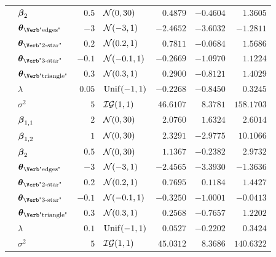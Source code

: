 \begin{table}[t]
\begin{tabular}{cl|rlrrr}
        & $\boldsymbol{\beta}_{2}$                       & $0.5$  & $\mathcal{N}(0,30)$      & $0.4879$  & $-0.4604$ & $1.3605$   \\
        & $\ttheta_{\text{\Verb"edges"}}$    & $-3$   & $\mathcal{N}(-3,1)$      & $-2.4652$ & $-3.6032$ & $-1.2811$  \\
        & $\ttheta_{\text{\Verb"2-star"}}$   & $0.2$  & $\mathcal{N}(0.2,1)$     & $0.7811$  & $-0.0684$ & $1.5686$   \\
        & $\ttheta_{\text{\Verb"3-star"}}$   & $-0.1$ & $\mathcal{N}(-0.1,1)$    & $-0.2669$ & $-1.0970$ & $1.1224$   \\
        & $\ttheta_{\text{\Verb"triangle"}}$ & $0.3$  & $\mathcal{N}(0.3,1)$     & $0.2900$  & $-0.8121$ & $1.4029$   \\
		\midrule
        & $\lambda$                          & $0.05$ & $\mathrm{Unif}(-1,1)$     & $-0.2268$ & $-0.8450$ & $0.3245$   \\
        & $\sigma^2$                         & $5$    & $\mathcal{IG}(1,1)$ & $46.6107$ & $8.3781$  & $158.1703$ \\
        & $\boldsymbol{\beta}_{1,1}$                     & $2$    & $\mathcal{N}(0,30)$      & $2.0760$  & $1.6324$  & $2.6014$   \\
        & $\boldsymbol{\beta}_{1,2}$                     & $1$    & $\mathcal{N}(0,30)$      & $2.3291$  & $-2.9775$ & $10.1066$  \\
        & $\boldsymbol{\beta}_{2}$                       & $0.5$  & $\mathcal{N}(0,30)$      & $1.1367$  & $-0.2382$ & $2.9732$   \\
        & $\ttheta_{\text{\Verb"edges"}}$    & $-3$   & $\mathcal{N}(-3,1)$      & $-2.4565$ & $-3.3930$ & $-1.3636$  \\
        & $\ttheta_{\text{\Verb"2-star"}}$   & $0.2$  & $\mathcal{N}(0.2,1)$     & $0.7695$  & $0.1184$  & $1.4427$   \\
        & $\ttheta_{\text{\Verb"3-star"}}$   & $-0.1$ & $\mathcal{N}(-0.1,1)$    & $-0.3250$ & $-1.0001$ & $-0.0413$  \\
        & $\ttheta_{\text{\Verb"triangle"}}$ & $0.3$  & $\mathcal{N}(0.3,1)$     & $0.2568$  & $-0.7657$ & $1.2202$   \\
		\midrule
		\midrule
        & $\lambda$                          & $0.1$  & $\mathrm{Unif}(-1,1)$     & $0.0527$  & $-0.2202$ & $0.3424$   \\
        & $\sigma^2$                         & $5$    & $\mathcal{IG}(1,1)$ & $45.0312$ & $8.3686$  & $140.6322$ \\

\end{tabular}
\end{table}
